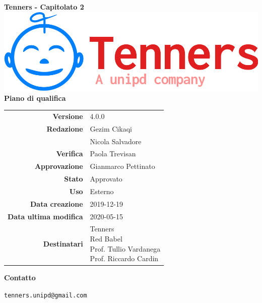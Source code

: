 \begin{titlepage}
	\begin{center}
		\large \textbf{Tenners - Capitolato 2}
		\vfill
		\includegraphics[scale = 0.3]{./res/img/logo.png}\\
		\vfill
		\Huge \textbf{Piano di qualifica}

        \vfill
        \large

        \begin{tabular}{r|l}
                        \textbf{Versione} & 4.0.0 \\
                        \textbf{Redazione} 
                        & Gezim Cikaqi \\
                        & Nicola Salvadore \\
                        \textbf{Verifica} &
                       	Paola Trevisan\\
                        \textbf{Approvazione} & Gianmarco Pettinato \\
                        \textbf{Stato} & Approvato \\
                        \textbf{Uso} &  Esterno\\
                        \textbf{Data creazione} &  2019-12-19\\
                        \textbf{Data ultima modifica} &  2020-05-15\\
                        \textbf{Destinatari} & \parbox[t]{5cm}{Tenners\\Red Babel\\Prof. Tullio Vardanega\\Prof. Riccardo Cardin}
                \end{tabular}
                \vfill
                \normalsize
                \vfill
                \textbf{Contatto}

                \texttt{tenners.unipd@gmail.com}

	\end{center}
\end{titlepage}
